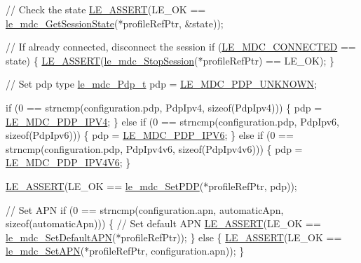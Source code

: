 \begin{DoxyCodeInclude}
{{{{{{{    \textcolor{comment}{// Check the state}
    \hyperlink{le__log_8h_ac0dbbef91dc0fed449d0092ff0557b39}{LE\_ASSERT}(LE\_OK == \hyperlink{le__mdc__interface_8h_add91c364e8b3e4e82a0ce64e480c016b}{le\_mdc\_GetSessionState}(*profileRefPtr, &state));

    \textcolor{comment}{// If already connected, disconnect the session}
    \textcolor{keywordflow}{if} (\hyperlink{le__mdc__interface_8h_a0727e543d0394422963c8d6297947333a0a8a2113935b881b76c59b94cf7223b8}{LE\_MDC\_CONNECTED} == state)
    \{
        \hyperlink{le__log_8h_ac0dbbef91dc0fed449d0092ff0557b39}{LE\_ASSERT}(\hyperlink{le__mdc__interface_8h_a53453f85065c3cace0922150b7e3d869}{le\_mdc\_StopSession}(*profileRefPtr) == LE\_OK);
    \}

    \textcolor{comment}{// Set pdp type}
    \hyperlink{le__mdc__interface_8h_a85721ec6046140c2f87c23f877dce247}{le\_mdc\_Pdp\_t} pdp = \hyperlink{le__mdc__interface_8h_a85721ec6046140c2f87c23f877dce247a590fd5c933c3751e42053f996d530987}{LE\_MDC\_PDP\_UNKNOWN};

    \textcolor{keywordflow}{if} (0 == strncmp(configuration.pdp, PdpIpv4, \textcolor{keyword}{sizeof}(PdpIpv4)))
    \{
        pdp = \hyperlink{le__mdc__interface_8h_a85721ec6046140c2f87c23f877dce247af550adf5bcecb680294f92f28496a830}{LE\_MDC\_PDP\_IPV4};
    \}
    \textcolor{keywordflow}{else} \textcolor{keywordflow}{if} (0 == strncmp(configuration.pdp, PdpIpv6, \textcolor{keyword}{sizeof}(PdpIpv6)))
    \{
        pdp = \hyperlink{le__mdc__interface_8h_a85721ec6046140c2f87c23f877dce247ac2d2a34bad2d18be1ea8facef0effad0}{LE\_MDC\_PDP\_IPV6};
    \}
    \textcolor{keywordflow}{else} \textcolor{keywordflow}{if} (0 == strncmp(configuration.pdp, PdpIpv4v6, \textcolor{keyword}{sizeof}(PdpIpv4v6)))
    \{
        pdp = \hyperlink{le__mdc__interface_8h_a85721ec6046140c2f87c23f877dce247a4427db8ba7a89ebf66c7b62eacfc8275}{LE\_MDC\_PDP\_IPV4V6};
    \}

    \hyperlink{le__log_8h_ac0dbbef91dc0fed449d0092ff0557b39}{LE\_ASSERT}(LE\_OK == \hyperlink{le__mdc__interface_8h_a73e66a7a63dc95d7f261fc2a26470386}{le\_mdc\_SetPDP}(*profileRefPtr, pdp));

    \textcolor{comment}{// Set APN}
    \textcolor{keywordflow}{if} (0 == strncmp(configuration.apn, automaticApn, \textcolor{keyword}{sizeof}(automaticApn)))
    \{
        \textcolor{comment}{// Set default APN}
        \hyperlink{le__log_8h_ac0dbbef91dc0fed449d0092ff0557b39}{LE\_ASSERT}(LE\_OK == \hyperlink{le__mdc__interface_8h_ad44bd756fd5cbfd43a5b348054786a4d}{le\_mdc\_SetDefaultAPN}(*profileRefPtr));
    \}
    \textcolor{keywordflow}{else}
    \{
        \hyperlink{le__log_8h_ac0dbbef91dc0fed449d0092ff0557b39}{LE\_ASSERT}(LE\_OK == \hyperlink{le__mdc__interface_8h_ae8ebd11b9cb9afb9b6b5745903f50156}{le\_mdc\_SetAPN}(*profileRefPtr, configuration.apn));
    \}

}}}}}}}
\end{DoxyCodeInclude}
